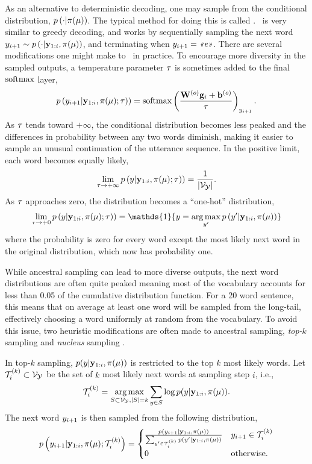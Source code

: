 As an alternative to deterministic decoding, one may sample from the
conditional distribution, $p\left(\cdot|\pi(\mu)\right)$. The typical method
for doing this is called \ancestralsampling. \Ancestralsampling~is very similar
to greedy decoding, and works by sequentially sampling the next word
$y_{i+1} \sim p\left(\cdot|\mathbf{y}_{1:i},\pi(\mu)\right)$, and
terminating when $y_{i+1} = \textit{<<e>>}$. There are several modifications
one might make to \ancestralsampling~in practice. To encourage more diversity
in the sampled outputs, a temperature parameter $\tau$ is sometimes
added to the final $\operatorname*{softmax}$ layer, \[ p\left(y_{i+1}|
\mathbf{y}_{1:i},\pi(\mu); \tau) \right) = \operatorname*{softmax}\left(
\frac{\mathbf{W}^{(o)}\mathbf{g}_i + \mathbf{b}^{(o)}}{\tau}
\right)_{y_{i+1}}.\] As $\tau$ tends toward $+\infty$, the
conditional distribution becomes less peaked and the differences in probability
between any two words diminish, making it easier to sample an unusual
continuation of the utterance sequence.  In the positive limit, each word
becomes equally likely, \[ \lim_{\tau\rightarrow +\infty}
p\left(y| \mathbf{y}_{1:i},\pi(\mu); \tau) \right) =
\frac{1}{{\left\vert \mathcal{V}_{\mathcal{Y}} \right\vert}}.\] As $\tau$ approaches zero, the
distribution becomes a ``one-hot'' distribution, \[
\lim_{\temperature\rightarrow +0} \gen\left(\utttok| \utttoks_{1:i},\ls(\mr);
\temperature) \right) = \mathds{1}\{\utttok = \argmax_{\utttok^\prime}
\gen\left(\utttok^\prime| \utttoks_{1:i},\ls(\mr)\right)  \}\] where the
probability is zero for every word except the most likely next word in the
original distribution, which now has probability one.

While ancestral sampling can lead to more diverse outputs, the next word
distributions are often quite peaked meaning most of the vocabulary accounts
for less than 0.05 of the cumulative distribution function. For a 20 word
sentence, this means that on average at least one word will be sampled from the
long-tail, effectively choosing a word uniformly at random from the vocabulary.
To avoid this issue, two heuristic modifications are often made to ancestral
sampling, \textit{top-$k$} sampling \citep{fan2018,holtzman2018,radford2019}
and \textit{nucleus} sampling \citep{holtzman2019}. 

In top-$k$ sampling, $p(y|\mathbf{y}_{1:i},\pi(\mu))$ is restricted to the
top $k$ most likely words. Let ${\mathcal{T}}_{i}^{(k)} \subset \mathcal{V}_{\mathcal{Y}}$ be the set
of $k$ most likely next words at sampling step $i$, i.e.,
\[{\mathcal{T}}_{i}^{(k)} = \operatorname*{arg\,max}_{S \subset \mathcal{V}_{\mathcal{Y}}, {\left\vert S \right\vert} = k} \sum_{y \in S} \log p(y|\mathbf{y}_{1:i},\pi(\mu)). \]
The next word $y_{i+1}$ is then sampled from the following distribution,
\[
    p\left(y_{i+1}|\mathbf{y}_{1:i},\pi(\mu);{\mathcal{T}}_{i}^{(k)}\right)
    =
    \begin{cases} 
   \frac{
   p(y_{i+1}|\mathbf{y}_{1:i},\pi(\mu))
   }{ 
       \sum_{y^\prime \in {\mathcal{T}}_{i}^{(k)}  }
   p(y^\prime|\mathbf{y}_{1:i},\pi(\mu))  
   }  & y_{i+1} \in {\mathcal{T}}_{i}^{(k)} \\ 
0 & \textrm{otherwise}. \end{cases} 
\]

